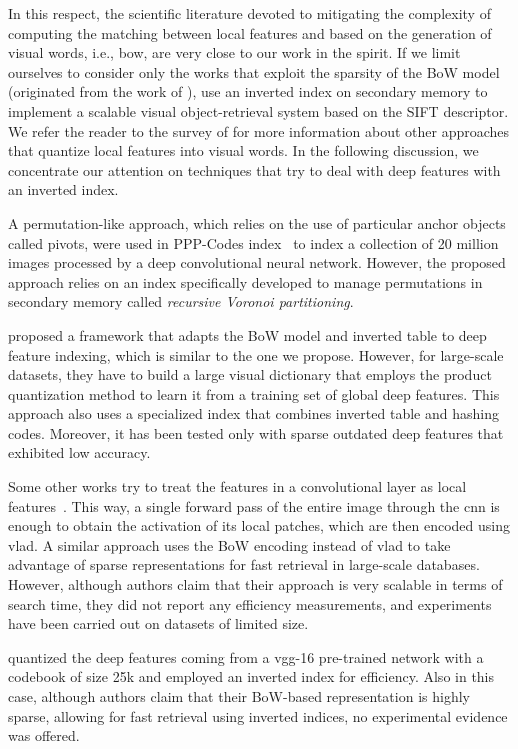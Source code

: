 In this respect, the scientific literature devoted to mitigating the complexity of computing the matching between local features and based on the generation of visual words, i.e., \acrfull{bow}, are very close to our work in the spirit.
If we limit ourselves to consider only the works that exploit the sparsity of the BoW model (originated from the work of \citet{sivic2003video}), \citet{philbin2007object} use an inverted index on secondary memory to implement a scalable visual object-retrieval system based on the SIFT descriptor.
We refer the reader to the survey of \citet{zheng2018sift} for more information about other approaches that quantize local features into visual words.
In the following discussion, we concentrate our attention on techniques that try to deal with deep features with an inverted index.

A permutation-like approach, which relies on the use of particular anchor objects called pivots, were used in PPP-Codes index~\cite{novak2015large} to index a collection of 20 million images processed by a deep convolutional neural network.
However, the proposed approach relies on an index specifically developed to manage permutations in secondary memory called \emph{recursive Voronoi partitioning}.

\citet{liu2015indexing} proposed a framework that adapts the BoW model and inverted table to deep feature indexing, which is similar to the one we propose.
However, for large-scale datasets, they have to build a large visual dictionary that employs the product quantization method to learn it from a training set of global deep features.
This approach also uses a specialized index that combines inverted table and hashing codes.
Moreover, it has been tested only with sparse outdated deep features that exhibited low accuracy.

Some other works try to treat the features in a convolutional layer as local features~\cite{arandjelovic2015netvlad,yue2015exploiting}.
This way, a single forward pass of the entire image through the \gls{cnn} is enough to obtain the activation of its local patches, which are then encoded using \acrfull{vlad}.
A similar approach uses the BoW encoding instead of \gls{vlad} to take advantage of sparse representations for fast retrieval in large-scale databases.
However, although authors claim that their approach is very scalable in terms of search time, they did not report any efficiency measurements, and experiments have been carried out on datasets of limited size.

\citet{mohedano2016bags} quantized the deep features coming from a \gls{vgg}-16 pre-trained network with a codebook of size 25k and employed an inverted index for efficiency.
Also in this case, although authors claim that their BoW-based representation is highly sparse, allowing for fast retrieval using inverted indices, no experimental evidence was offered.

